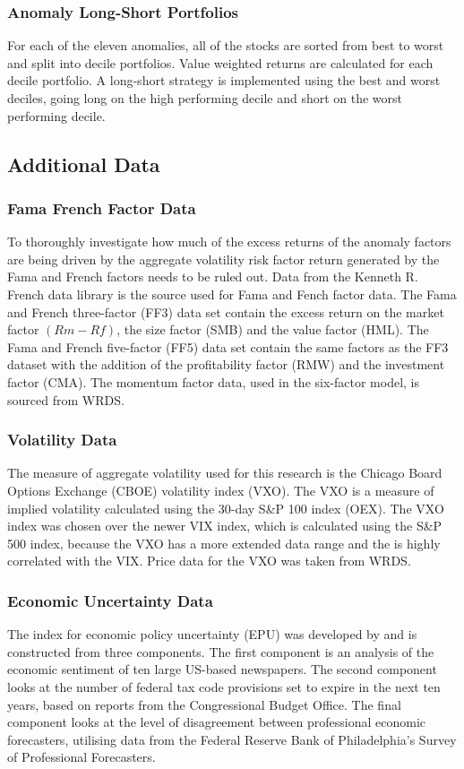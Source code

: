 \documentclass[a4paper,12pt]{article}                 %
\begin{document}
\subsubsection{Anomaly Long-Short Portfolios}
For each of the eleven anomalies, all of the stocks are sorted from best to worst and split into decile portfolios. Value weighted returns are calculated for each decile portfolio. A long-short strategy is implemented using the best and worst deciles, going long on the high performing decile and short on the worst performing decile. 

\subsection{Additional Data}
\subsubsection{Fama French Factor Data}
To thoroughly investigate how much of the excess returns of the anomaly factors are being driven by the aggregate volatility risk factor return generated by the Fama and French factors needs to be ruled out. Data from the Kenneth R. French data library is the source used for Fama and Fench factor data. The Fama and French three-factor (FF3) data set contain the excess return on the market factor $(Rm - Rf)$, the size factor (SMB) and the value factor (HML). The Fama and French five-factor (FF5) data set contain the same factors as the FF3 dataset with the addition of the profitability factor (RMW) and the investment factor (CMA). The momentum factor data, used in the six-factor model, is sourced from WRDS.

\subsubsection{Volatility Data}
The measure of aggregate volatility used for this research is the Chicago Board Options Exchange (CBOE) volatility index (VXO). The VXO is a measure of implied volatility calculated using the 30-day S\&P 100 index (OEX). The VXO index was chosen over the newer VIX index, which is calculated using the S\&P 500 index, because the VXO has a more extended data range and the is highly correlated with the VIX. Price data for the VXO was taken from WRDS.

\subsubsection{Economic Uncertainty Data}
The index for economic policy uncertainty (EPU) was developed by\cite{baker2016measuring} and is constructed from three components. The first component is an analysis of the economic sentiment of ten large US-based newspapers. The second component looks at the number of federal tax code provisions set to expire in the next ten years, based on reports from the Congressional Budget Office. The final component looks at the level of disagreement between professional economic forecasters, utilising data from the Federal Reserve Bank of Philadelphia's Survey of Professional Forecasters.
\end{document}
